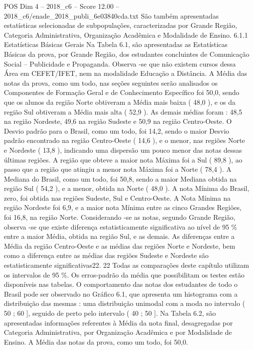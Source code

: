 \begin{textsample}{POS Dim 4 – 2018\_c6 – Score 12.00 – 2018\_c6/enade\_2018\_publi\_6e03840cda.txt}
São também apresentadas estatísticas selecionadas de subpopulações, caracterizadas por Grande Região, Categoria Administrativa, Organização Acadêmica e Modalidade de Ensino. 6.1.1 Estatísticas Básicas Gerais Na Tabela 6.1, são apresentadas as Estatísticas Básicas da prova, por Grande Região, dos estudantes concluintes de Comunicação Social – Publicidade e Propaganda.
Observa -se que não existem cursos dessa Área em CEFET/IFET, nem na modalidade Educação a Distância.
A Média das notas da prova, como um todo, nas seções seguintes serão analisados os Componentes de Formação Geral e de Conhecimento Específico foi 50,0, sendo que os alunos da região Norte obtiveram a Média mais baixa ( 48,0 ), e os da região Sul obtiveram a Média mais alta ( 52,9 ).
As demais médias foram : 48,5 na região Nordeste, 49,6 na região Sudeste e 50,9 na região Centro-Oeste.
O Desvio padrão para o Brasil, como um todo, foi 14,2, sendo o maior Desvio padrão encontrado na região Centro-Oeste ( 14,6 ), e o menor, nas regiões Norte e Nordeste ( 13,8 ), indicando uma dispersão um pouco menor das notas dessas últimas regiões.
A região que obteve a maior nota Máxima foi a Sul ( 89,8 ), ao passo que a região que atingiu a menor nota Máxima foi a Norte ( 78,4 ).
A Mediana do Brasil, como um todo, foi 50,8, sendo a maior Mediana obtida na região Sul ( 54,2 ), e a menor, obtida na Norte ( 48,0 ).
A nota Mínima do Brasil, zero, foi obtida nas regiões Sudeste, Sul e Centro-Oeste.
A Nota Mínima na região Nordeste foi 6,9, e a maior nota Mínima entre as cinco Grandes Regiões, foi 16,8, na região Norte.
Considerando -se as notas, segundo Grande Região, observa -se que existe diferença estatisticamente significativa ao nível de 95 \% entre a maior Média, obtida na região Sul, e as demais.
As diferenças entre a Média da região Centro-Oeste e as médias das regiões Norte e Nordeste, bem como a diferença entre as médias das regiões Sudeste e Nordeste são estatisticamente significativas22. 22 Todas as comparações deste capítulo utilizam os intervalos de 95 \%.
Os erros-padrão da média que possibilitam os testes estão disponíveis nas tabelas.
O comportamento das notas dos estudantes de todo o Brasil pode ser observado no Gráfico 6.1, que apresenta um histograma com a distribuição das mesmas : uma distribuição unimodal com a moda no intervalo ( 50 ; 60 ], seguido de perto pelo intervalo ( 40 ; 50 ].
Na Tabela 6.2, são apresentadas informações referentes à Média da nota final, desagregadas por Categoria Administrativa, por Organização Acadêmica e por Modalidade de Ensino.
A Média das notas da prova, como um todo, foi 50,0.

\end{textsample}
